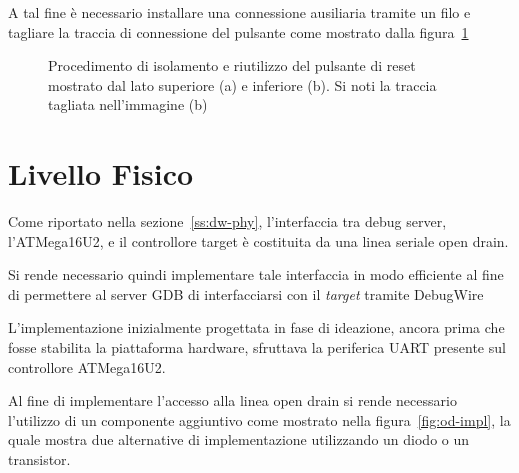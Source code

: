 A tal fine è necessario installare una connessione ausiliaria tramite un filo e tagliare la traccia di connessione del pulsante come mostrato dalla figura~\ref{fig:rst-rewire}

\begin{figure}[h]
    \centering
    \hspace{8mm}

    \caption[]{Procedimento di isolamento e riutilizzo del pulsante di reset mostrato dal lato superiore (a) e inferiore (b). Si noti la traccia tagliata nell'immagine (b)}\label{fig:rst-rewire}
\end{figure}

\section{Livello Fisico}

Come riportato nella sezione~\ref{ss:dw-phy}, l'interfaccia tra debug server, l'ATMega16U2, e il controllore target è costituita da una linea seriale open drain.

Si rende necessario quindi implementare tale interfaccia in modo efficiente al fine di permettere al server GDB di interfacciarsi con il \textit{target} tramite DebugWire

L'implementazione inizialmente progettata in fase di ideazione, ancora prima che fosse stabilita la piattaforma hardware, sfruttava la periferica UART presente sul controllore ATMega16U2\cite[chap. 18]{avr:m16u2}.

Al fine di implementare l'accesso alla linea open drain si rende necessario l'utilizzo di un componente aggiuntivo come mostrato nella figura~\ref{fig:od-impl}, la quale mostra due alternative di implementazione utilizzando un diodo o un transistor. 

